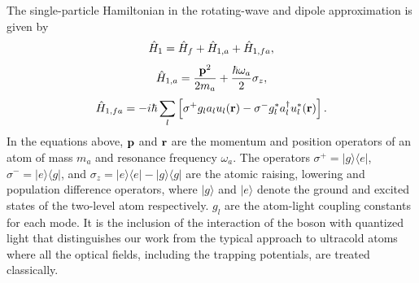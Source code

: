 The single-particle Hamiltonian in the rotating-wave and dipole
approximation is given by
\begin{equation}
  \hat{H}_1 = \hat{H}_f + \hat{H}_{1,a} + \hat{H}_{1,fa},
\end{equation}
\begin{equation}
  \hat{H}_{1,a} = \frac{\mathbf{p}^2} {2 m_a} + \frac{\hbar \omega_a}{2} \sigma_z,
\end{equation}
\begin{equation}
  \hat{H}_{1,fa} =  - i \hbar \sum_l \left[ \sigma^+ g_l a_l u_l(\mathbf{r}) - \sigma^- g^*_l
    a^\dagger_l u^*_l(\mathbf{r}) \right].
\end{equation}
In the equations above, $\mathbf{p}$ and $\mathbf{r}$ are the momentum and
position operators of an atom of mass $m_a$ and resonance frequency
$\omega_a$. The operators $\sigma^+ = |g \rangle \langle e|$,
$\sigma^- = |e \rangle \langle g|$, and
$\sigma_z = |e \rangle \langle e| - |g \rangle \langle g|$ are the
atomic raising, lowering and population difference operators, where
$|g \rangle$ and $| e \rangle$ denote the ground and excited states of
the two-level atom respectively. $g_l$ are the atom-light coupling
constants for each mode. It is the inclusion of the interaction of the
boson with quantized light that distinguishes our work from the
typical approach to ultracold atoms where all the optical fields,
including the trapping potentials, are treated classically.

